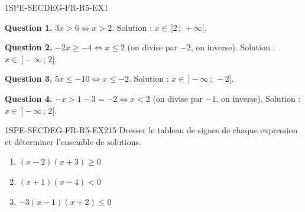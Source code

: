 
\begin{corrige}{1SPE-SECDEG-FR-R5-EX1}


\textbf{Question 1.} $3x > 6 \Leftrightarrow x > 2$. Solution : $x \in \,]2\,;\,+\infty[$.


\textbf{Question 2.} $-2x \geq -4 \Leftrightarrow x \leq 2$ (on divise par $-2$, on inverse). Solution : $x \in \,]-\infty\,;\,2]$.

\textbf{Question 3.} $5x \leq -10 \Leftrightarrow x \leq -2$. Solution : $x \in \,]-\infty\,;\,-2]$.

\textbf{Question 4.} $-x > 1 - 3 = -2 \Leftrightarrow x < 2$ (on divise par $-1$, on inverse). Solution : $x \in \,]-\infty\,;\,2[$.

\end{corrige}


\begin{exercice}{1SPE-SECDEG-FR-R5-EX2}{1}{5}
Dresser le tableau de signes de chaque expression et déterminer l'ensemble de solutions.
\begin{enumerate}
  \item $(x - 2)(x + 3) \geq 0$
  \item $(x + 1)(x - 4) < 0$
  \item $-3(x - 1)(x + 2) \leq 0$
\end{enumerate}
\end{exercice}


